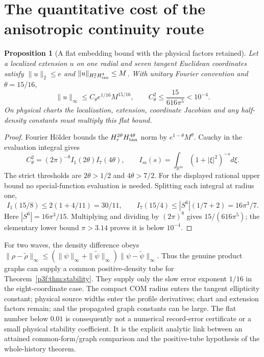 \documentclass[11pt]{article}
\numberwithin{equation}{section}
\newtheorem{proposition}[theorem]{Proposition}
\theoremstyle{definition}
\theoremstyle{remark}
\begin{document}
\section{The quantitative cost of the anisotropic continuity route}
\label{p3d:sec:quantitative}

\begin{proposition}[A flat embedding bound with the physical factors retained]
\label{p3d:prop:quantitative}
Let a localized extension $u$ on one radial and seven tangent Euclidean
coordinates satisfy $\|u\|_2\leq e$ and
$\|u\|_{H^2_rH^4_{\rm tan}}\leq M$.
With unitary Fourier convention and $\theta=15/16$,
\begin{equation}\label{p3d:eq:quantitative}
 \|u\|_\infty\leq C_\theta e^{1/16}M^{15/16},\qquad
 C_\theta^2\leq\frac{15}{616\pi^5}<10^{-4}.
\end{equation}
On physical charts the localization, extension, coordinate Jacobian
and any half-density constants must multiply this flat bound.
\end{proposition}
\begin{proof}
Fourier H\"older bounds the
$H^{2\theta}_rH^{4\theta}_{\rm tan}$ norm by
$e^{1-\theta}M^\theta$. Cauchy in the evaluation integral gives
\[
 C_\theta^2=(2\pi)^{-8}I_1(2\theta)I_7(4\theta),\qquad
 I_m(s)=\int_{\mathbb R^m}(1+|\xi|^2)^{-s}d\xi .
\]
The strict thresholds are $2\theta>1/2$ and $4\theta>7/2$.
For the displayed rational upper bound no special-function
evaluation is needed. Splitting each integral at radius one,
\[
 I_1(15/8)\leq2(1+4/11)=30/11,\qquad
 I_7(15/4)\leq |S^6|(1/7+2)=16\pi^3/7.
\]
Here $|S^6|=16\pi^3/15$.
Multiplying and dividing by $(2\pi)^8$ gives
$15/(616\pi^5)$; the elementary lower bound $\pi>3.14$
proves it is below $10^{-4}$.
\end{proof}

For two waves, the density difference obeys
$\|\rho-\widetilde\rho\|_\infty
\leq(\|\psi\|_\infty+\|\widetilde\psi\|_\infty)
       \|\psi-\widetilde\psi\|_\infty$.
Thus the genuine product graphs can supply a common positive-density
tube for Theorem~\ref{p3f:thm:stability}.
They supply only the slow error exponent $1/16$ in the eight-coordinate
case. The compact COM radius enters the tangent ellipticity constant;
physical source widths enter the profile derivatives; chart and
extension factors remain; and the propagated graph constants can be
large. The flat number below $0.01$ is consequently not a numerical
record-error certificate or a small physical stability coefficient.
It is the explicit analytic link between an attained common-form/graph
comparison and the positive-tube hypothesis of the whole-history
theorem.
\end{document}
